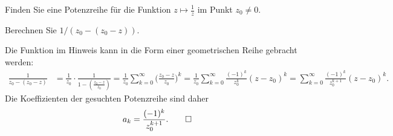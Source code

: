 Finden Sie eine Potenzreihe für die Funktion
\(
z\mapsto \frac{1}{z}
\)
im Punkt $z_0\ne 0$.

\begin{hinweis}
Berechnen Sie $1/(z_0 - (z_0-z))$.
\end{hinweis}

\begin{loesung}
Die Funktion im Hinweis kann in die Form einer geometrischen Reihe
gebracht werden:
\begin{align*}
\frac{1}{z_0-(z_0-z)}
&=
\frac{1}{z_0}
\cdot
\frac{1}{1-(\frac{z_0-z}{z_0})}
=
\frac{1}{z_0}
\sum_{k=0}^\infty \biggl(\frac{z_0-z}{z_0}\biggr)^k
=
\frac{1}{z_0}
\sum_{k=0}^\infty \frac{(-1)^k}{z_0^k} (z-z_0)^k
=
\sum_{k=0}^\infty \frac{(-1)^k}{z_0^{k+1}} (z-z_0)^k.
\end{align*}
Die Koeffizienten der gesuchten Potenzreihe sind daher 
\[
a_k = \frac{(-1)^k}{z_0^{k+1}}.
\qedhere
\]
\end{loesung}




